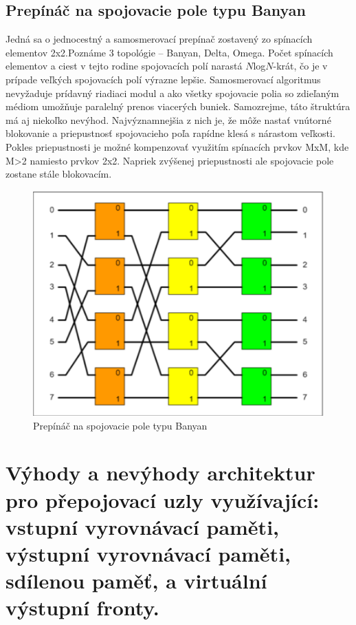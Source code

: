 \subsection{Prepínáč na spojovacie pole typu Banyan}
Jedná sa o jednocestný a samosmerovací prepínač zostavený zo spínacích elementov 2x2.Poznáme 3 topológie -- Banyan, Delta, Omega.\newline
Počet spínacích elementov a ciest v tejto rodine spojovacích polí narastá $N$log$N$-krát, čo je v prípade veľkých spojovacích polí výrazne lepšie. Samosmerovací algoritmus nevyžaduje prídavný riadiaci modul a ako všetky spojovacie polia so zdieľaným médiom umožňuje paralelný prenos viacerých buniek. Samozrejme, táto štruktúra má aj niekoľko nevýhod. Najvýznamnejšia z nich je, že môže nastať vnútorné blokovanie a priepustnosť spojovacieho poľa rapídne klesá s nárastom veľkosti. Pokles priepustnosti je možné kompenzovať využitím spínacích prvkov MxM, kde M>2 namiesto prvkov 2x2. Napriek zvýšenej priepustnosti ale spojovacie pole zostane stále blokovacím.

\begin{figure}[ht]
\centering
  \begin{center}
    \includegraphics[scale=0.8]{images/banyan.png}
  \end{center}
  \caption[Prepínáč na spojovacie pole typu Banyan]{Prepínáč na spojovacie pole typu Banyan}
\end{figure}

\newpage
\section{Výhody a nevýhody architektur pro přepojovací uzly využívající: vstupní vyrovnávací paměti, výstupní vyrovnávací paměti, sdílenou paměť, a virtuální výstupní fronty.}

